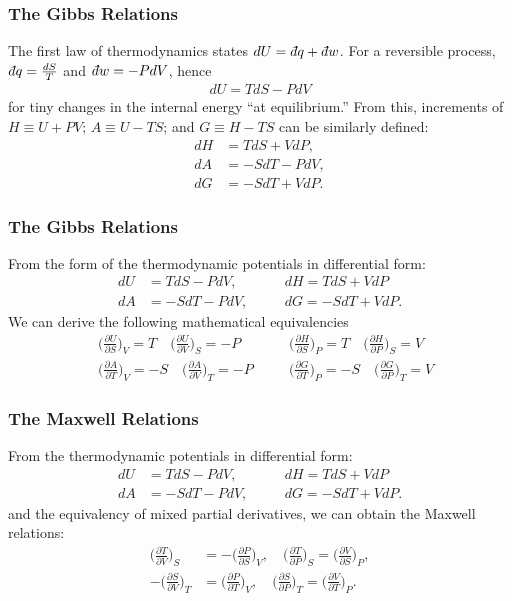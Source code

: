 \documentclass{beamer}
\newcommand{\dbar}{{d\mkern-7mu\mathchar'26\mkern-2mu}}
\newenvironment{noheadline}{
	\setbeamertemplate{headline}{}
	\addtobeamertemplate{frametitle}{\vspace*{-0.9\baselineskip}}{}
}{}
\newcommand{\insertcurrentcitation}{}
\newcommand{\currentcitation}[1]{
	\renewcommand{\insertcurrentcitation}{#1}
} %
\begin{document}
\begin{noheadline}
\currentcitation{}
\begin{frame}
\frametitle{The Gibbs Relations}
The first law of thermodynamics states $dU = \dbar q + \dbar w$. For a reversible process, $\dbar q = \frac{dS}{T}$ and $\dbar w = -P dV$, hence
\begin{align*}
	dU = TdS - PdV
\end{align*}
for tiny changes in the internal energy ``at equilibrium.''
From this, increments of $H \equiv U + PV$; $A \equiv U - TS$; and $G \equiv H - TS$ can be similarly defined:
\begin{align*}
dH &= TdS + VdP,\\
dA &= - SdT - PdV,\\
dG &= -SdT + VdP.
\end{align*}
\end{frame}

\begin{frame}
\frametitle{The Gibbs Relations}
From the form of the thermodynamic potentials in differential form:
\begin{align*}
dU &= TdS - PdV,\quad &&dH = TdS + VdP\\
dA &= - SdT - PdV,\quad &&dG = -SdT + VdP.
\end{align*}
We can derive the following mathematical equivalencies
\begin{align*}
&\bigg( \frac{\partial U}{\partial S} \bigg)_{V} = T\quad \bigg( \frac{\partial U}{\partial V} \bigg)_{S} = -P\quad
&&\bigg( \frac{\partial H}{\partial S} \bigg)_{P} = T\quad \bigg( \frac{\partial H}{\partial P} \bigg)_{S} = V\\
&\bigg( \frac{\partial A}{\partial T} \bigg)_{V} = -S\quad \bigg( \frac{\partial A}{\partial V} \bigg)_{T} = -P\quad
&&\bigg( \frac{\partial G}{\partial T} \bigg)_{P} = -S\quad \bigg( \frac{\partial G}{\partial P} \bigg)_{T} = V
\end{align*}
\end{frame}

\begin{frame}
\frametitle{The Maxwell Relations}
From the thermodynamic potentials in differential form:
\begin{align*}
dU &= TdS - PdV,\quad &&dH = TdS + VdP\\
dA &= - SdT - PdV,\quad &&dG = -SdT + VdP.
\end{align*}
and the equivalency of mixed partial derivatives, we can obtain the Maxwell relations:
\begin{align*}
\bigg( \frac{\partial T}{\partial V} \bigg)_{S} &= -\bigg( \frac{\partial P}{\partial S} \bigg)_{V},\quad
\bigg( \frac{\partial T}{\partial P} \bigg)_{S} = \bigg( \frac{\partial V}{\partial S} \bigg)_{P},\\
-\bigg( \frac{\partial S}{\partial V} \bigg)_{T} &= \bigg( \frac{\partial P}{\partial T} \bigg)_{V},\quad
\bigg( \frac{\partial S}{\partial P} \bigg)_{T} = \bigg( \frac{\partial V}{\partial T} \bigg)_{P}.
\end{align*}
\end{frame}


\end{noheadline}
\end{document}
